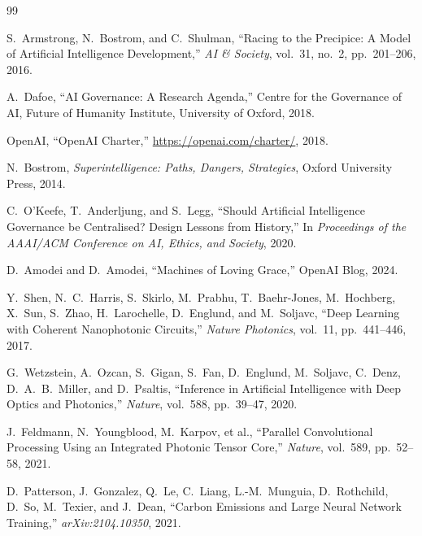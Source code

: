 \documentclass[12pt]{article}
\begin{document}
\begin{thebibliography}{99}

S.~Armstrong, N.~Bostrom, and C.~Shulman,
\newblock ``Racing to the Precipice: A Model of Artificial Intelligence Development,''
\newblock \emph{AI \& Society}, vol.~31, no.~2, pp.~201--206, 2016.

A.~Dafoe,
\newblock ``AI Governance: A Research Agenda,''
\newblock Centre for the Governance of AI, Future of Humanity Institute, University of Oxford, 2018.

OpenAI,
\newblock ``OpenAI Charter,''
\newblock \url{https://openai.com/charter/}, 2018.

N.~Bostrom,
\newblock \emph{Superintelligence: Paths, Dangers, Strategies},
\newblock Oxford University Press, 2014.

C.~O'Keefe, T.~Anderljung, and S.~Legg,
\newblock ``Should Artificial Intelligence Governance be Centralised? Design Lessons from History,''
\newblock In \emph{Proceedings of the AAAI/ACM Conference on AI, Ethics, and Society}, 2020.

D.~Amodei and D.~Amodei,
\newblock ``Machines of Loving Grace,''
\newblock OpenAI Blog, 2024.

Y.~Shen, N.~C.~Harris, S.~Skirlo, M.~Prabhu, T.~Baehr-Jones, M.~Hochberg, X.~Sun, S.~Zhao, H.~Larochelle, D.~Englund, and M.~Soljavc,
\newblock ``Deep Learning with Coherent Nanophotonic Circuits,''
\newblock \emph{Nature Photonics}, vol.~11, pp.~441--446, 2017.

G.~Wetzstein, A.~Ozcan, S.~Gigan, S.~Fan, D.~Englund, M.~Soljavc, C.~Denz, D.~A.~B.~Miller, and D.~Psaltis,
\newblock ``Inference in Artificial Intelligence with Deep Optics and Photonics,''
\newblock \emph{Nature}, vol.~588, pp.~39--47, 2020.

J.~Feldmann, N.~Youngblood, M.~Karpov, et al.,
\newblock ``Parallel Convolutional Processing Using an Integrated Photonic Tensor Core,''
\newblock \emph{Nature}, vol.~589, pp.~52--58, 2021.

D.~Patterson, J.~Gonzalez, Q.~Le, C.~Liang, L.-M.~Munguia, D.~Rothchild, D.~So, M.~Texier, and J.~Dean,
\newblock ``Carbon Emissions and Large Neural Network Training,''
\newblock \emph{arXiv:2104.10350}, 2021.


\end{thebibliography}
\end{document}
